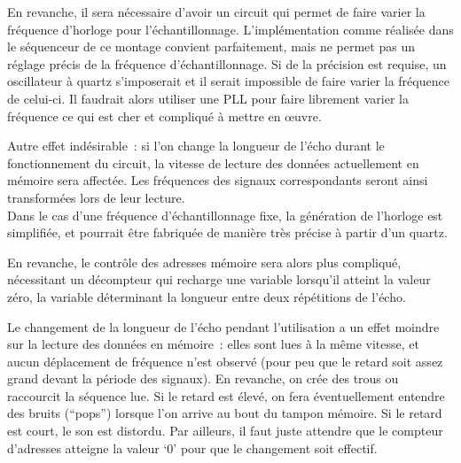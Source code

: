 \documentclass{article}
\begin{document}
En revanche, il sera nécessaire d'avoir un circuit qui permet de faire varier la fréquence d'horloge pour l'échantillonnage. L'implémentation comme réalisée dans le séquenceur de ce montage convient parfaitement, mais ne permet pas un réglage précis de la fréquence d'échantillonnage. Si de la précision est requise, un oscillateur à quartz s'imposerait et il serait impossible de faire varier la fréquence de celui-ci. Il faudrait alors utiliser une PLL pour faire librement varier la fréquence ce qui est cher et compliqué à mettre en œuvre.

Autre effet indésirable~: si l'on change la longueur de l'écho durant le fonctionnement du circuit, la vitesse de lecture des données actuellement en mémoire sera affectée. Les fréquences des signaux correspondants seront ainsi transformées lors de leur lecture.
\\

Dans le cas d'une fréquence d'échantillonnage fixe, la génération de l'horloge est simplifiée, et pourrait être fabriquée de manière très précise à partir d'un quartz.

En revanche, le contrôle des adresses mémoire sera alors plus compliqué, nécessitant un décompteur qui recharge une variable lorsqu'il atteint la valeur zéro, la variable déterminant la longueur entre deux répétitions de l'écho.

Le changement de la longueur de l'écho pendant l'utilisation a un effet moindre sur la lecture des données en mémoire~: elles sont lues à la même vitesse, et aucun déplacement de fréquence n'est observé (pour peu que le retard soit assez grand devant la période des signaux). En revanche, on crée des trous ou raccourcit la séquence lue. Si le retard est élevé, on fera éventuellement entendre des bruits (``pops'') lorsque l'on arrive au bout du tampon mémoire. Si le retard est court, le son est distordu. 
Par ailleurs, il faut juste attendre que le compteur d'adresses atteigne la valeur `0' pour que le changement soit effectif.
\end{document}
